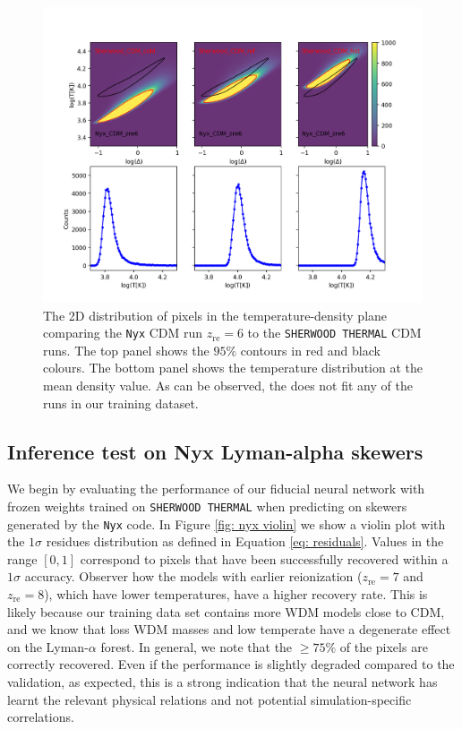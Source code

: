 \begin{figure}
    \centering
    \includegraphics[width=0.99\linewidth]{img/ML/TD_plane_nyx_sher.png}
    \caption{The 2D distribution of pixels in the temperature-density plane comparing the \texttt{Nyx} CDM run $z_\mathrm{re}=6$ to the \texttt{SHERWOOD THERMAL} CDM runs. The top panel shows the $95\%$ contours in red and black colours. The bottom panel shows the temperature distribution at the mean density value. As can be observed, the  does not fit any of the runs in our training dataset.}
    \label{fig: nyx TD}
\end{figure}

\subsection{Inference test on Nyx Lyman-alpha skewers}
We begin by evaluating the performance of our fiducial neural network with frozen weights trained on \texttt{SHERWOOD THERMAL} when predicting on skewers generated by the \texttt{Nyx} code. In Figure \ref{fig: nyx violin} we show a violin plot with the $1\sigma$ residues distribution as defined in Equation \ref{eq: residuals}. Values in the range $[0,1]$ correspond to pixels that have been successfully recovered within a $1\sigma$ accuracy. Observer how the models with earlier reionization ($z_\mathrm{re}=7$ and $z_\mathrm{re}=8$), which have lower temperatures, have a higher recovery rate. This is likely because our training data set contains more WDM models close to CDM, and we know that loss WDM masses and low temperate have a degenerate effect on the Lyman-$\alpha$ forest. In general, we note that the $\geq 75 \%$ of the pixels are correctly recovered. Even if the performance is slightly degraded compared to the  validation, as expected, this is a strong indication that the neural network has learnt the relevant physical relations and not potential simulation-specific correlations.

